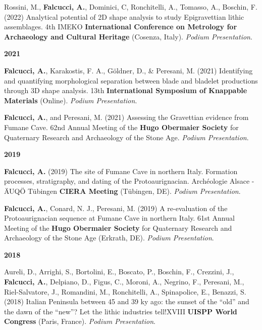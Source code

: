 \documentclass[11pt,a4paper,]{awesome-cv}
\begin{document}
Rossini, M., \textbf{Falcucci, A.}, Dominici, C, Ronchitelli, A.,
Tomasso, A., Boschin, F. (2022) Analytical potential of 2D shape
analysis to study Epigravettian lithic assemblages. 4th IMEKO
\textbf{International Conference on Metrology for Archaeology and
Cultural Heritage} (Cosenza, Italy). \emph{Podium Presentation}.

\setlength{\leftskip}{0cm}

\textbf{2021}

\setlength{\leftskip}{1cm}

\textbf{Falcucci, A.}, Karakostis, F. A., Göldner, D., \& Peresani, M.
(2021) Identifying and quantifying morphological separation between
blade and bladelet productions through 3D shape analysis. 13th
\textbf{International Symposium of Knappable Materials} (Online).
\emph{Podium Presentation}.

\textbf{Falcucci, A.}, and Peresani, M. (2021) Assessing the Gravettian
evidence from Fumane Cave. 62nd Annual Meeting of the \textbf{Hugo
Obermaier Society} for Quaternary Research and Archaeology of the Stone
Age. \emph{Podium Presentation}.

\setlength{\leftskip}{0cm}

\textbf{2019}

\setlength{\leftskip}{1cm}

\textbf{Falcucci, A.} (2019) The site of Fumane Cave in northern Italy.
Formation processes, stratigraphy, and dating of the Protoaurignacian.
Archéologie Alsace - ÄUQÖ Tübingen \textbf{CIERA Meeting} (Tübingen,
DE). \emph{Podium Presentation}.

\textbf{Falcucci, A.}, Conard, N. J., Peresani, M. (2019) A
re-evaluation of the Protoaurignacian sequence at Fumane Cave in
northern Italy. 61st Annual Meeting of the \textbf{Hugo Obermaier
Society} for Quaternary Research and Archaeology of the Stone Age
(Erkrath, DE). \emph{Podium Presentation}.

\setlength{\leftskip}{0cm}

\textbf{2018}

\setlength{\leftskip}{1cm}

Aureli, D., Arrighi, S., Bortolini, E., Boscato, P., Boschin, F.,
Crezzini, J., \textbf{Falcucci, A.}, Delpiano, D., Figus, C., Moroni,
A., Negrino, F., Peresani, M., Riel-Salvatore, J., Romandini, M.,
Ronchitelli, A., Spinapolice, E., Benazzi, S. (2018) Italian Peninsula
between 45 and 39 ky ago: the sunset of the ``old'' and the dawn of the
``new''? Let the lithic industries tell!XVIII \textbf{UISPP World
Congress} (Paris, France). \emph{Podium Presentation}.
\end{document}
